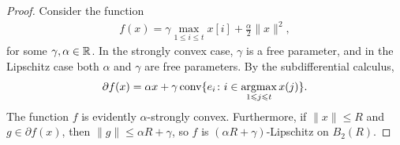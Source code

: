 \begin{proof}
Consider the function
\begin{align*}
    f(x) = \gamma \max_{1 \leq i \leq t} x[i] + \frac{\alpha}{2} \|x\|^2,
\end{align*}
for some $\gamma, \alpha \in \mathbb{R}$. In the strongly convex case, $\gamma$ is
a free parameter, and in the Lipschitz case both $\alpha$ and $\gamma$ are
free parameters. By the subdifferential calculus,
\begin{align*}
    \partial f(x) 
        = \alpha x + \gamma \mathop{\rm conv}\{e_i \colon i \in \mathop{\rm argmax}_{1 \leqslant j \leqslant t} x(j)\}.
\end{align*}
The function $f$ is evidently $\alpha$-strongly convex. Furthermore, if $\|x\| \leq R$
and $g \in \partial f(x)$, then $\|g\| \leq \alpha R + \gamma$, so $f$ is
$(\alpha R + \gamma)$-Lipschitz on $B_2(R)$.


\end{proof}
